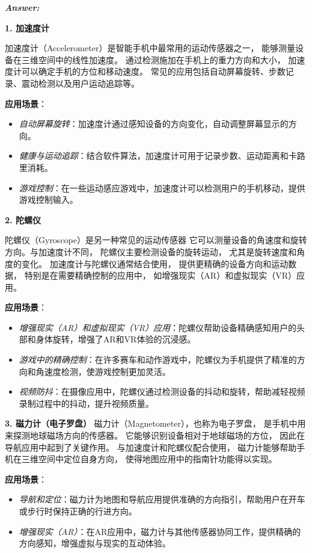 \documentclass[12pt]{article}
\newenvironment{Answer}{
  \vspace{12pt}
  {\large\textbf{\textit{\hspace{-12pt}Answer:}}}\par
  \vspace{8pt}
} {\vspace{24pt}}
\begin{document}
\begin{Answer}
\noindent\textbf{1. 加速度计}\noindent

加速度计（Accelerometer）是智能手机中最常用的运动传感器之一，
能够测量设备在三维空间中的线性加速度。
通过检测施加在手机上的重力方向和大小，
加速度计可以确定手机的方位和移动速度。
常见的应用包括自动屏幕旋转、步数记录、震动检测以及用户运动追踪等。

\textbf{应用场景}：
\begin{itemize}
    \item \textit{自动屏幕旋转}：加速度计通过感知设备的方向变化，自动调整屏幕显示的方向。
    \item \textit{健康与运动追踪}：结合软件算法，加速度计可用于记录步数、运动距离和卡路里消耗。
    \item \textit{游戏控制}：在一些运动感应游戏中，加速度计可以检测用户的手机移动，提供游戏控制输入。
\end{itemize}

\noindent\textbf{2. 陀螺仪}\noindent

陀螺仪（Gyroscope）是另一种常见的运动传感器
它可以测量设备的角速度和旋转方向。与加速度计不同，
陀螺仪主要检测设备的旋转运动，
尤其是旋转速度和角度的变化。
加速度计与陀螺仪通常结合使用，
提供更精确的设备方向和运动数据，
特别是在需要精确控制的应用中，
如增强现实（AR）和虚拟现实（VR）应用。

\textbf{应用场景}：
\begin{itemize}
    \item \textit{增强现实（AR）和虚拟现实（VR）应用}：陀螺仪帮助设备精确感知用户的头部和身体旋转，增强了AR和VR体验的沉浸感。
    \item \textit{游戏中的精确控制}：在许多赛车和动作游戏中，陀螺仪为手机提供了精准的方向和角速度检测，使游戏控制更加灵活。
    \item \textit{视频防抖}：在摄像应用中，陀螺仪通过检测设备的抖动和旋转，帮助减轻视频录制过程中的抖动，提升视频质量。
\end{itemize}

\noindent\textbf{3. 磁力计（电子罗盘）}\noindent
磁力计（Magnetometer），也称为电子罗盘，
是手机中用来探测地球磁场方向的传感器。
它能够识别设备相对于地球磁场的方位，
因此在导航应用中起到了关键作用。
与加速度计和陀螺仪配合使用，
磁力计能够帮助手机在三维空间中定位自身方向，
使得地图应用中的指南针功能得以实现。

\textbf{应用场景}：
\begin{itemize}
    \item \textit{导航和定位}：磁力计为地图和导航应用提供准确的方向指引，帮助用户在开车或步行时保持正确的行进方向。
    \item \textit{增强现实（AR）}：在AR应用中，磁力计与其他传感器协同工作，提供精确的方向感知，增强虚拟与现实的互动体验。
\end{itemize}


\end{Answer}
\end{document}
